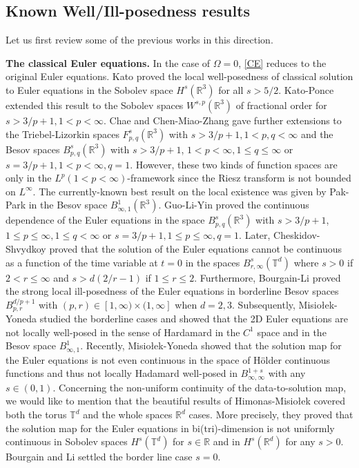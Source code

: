 \documentclass[12pt]{article}
\newcommand{\R}{\mathbb{R}}
\begin{document}
\subsection{Known Well/Ill-posedness results}
Let us first review some of the previous works in this direction.

{\bf The classical Euler equations.}\;
In the case of $\Omega=0$, \eqref{CE} reduces to the original Euler equations. Kato \cite{Kato} proved the local well-posedness of classical solution to Euler equations in the Sobolev space $H^s(\mathbb{R}^3)$ for all $s>5/2$. Kato-Ponce \cite{KatoP} extended this result to the Sobolev spaces $W^{s, p}(\mathbb{R}^3)$ of fractional order for $s>3 / p+1,1<p<\infty$. Chae \cite{Chae1,Chae2,Chae3} and Chen-Miao-Zhang \cite{Miao} gave further extensions to the Triebel-Lizorkin spaces $F_{p, q}^s(\mathbb{R}^3)$ with $s>3 / p+1,1<p, q<\infty$ and the Besov spaces $B_{p, q}^s(\mathbb{R}^3)$ with $s>3 / p+1$, $1<p<\infty, 1 \leq q \leq \infty$ or $s=3 / p+1,1<p<\infty, q=1$. However, these two kinds of function spaces are only in the $L^p(1<p<\infty)$-framework since the Riesz transform is not bounded on $L^{\infty}$. The currently-known best result on the local existence was given by Pak-Park \cite{Pak} in the Besov space $B_{\infty, 1}^1(\mathbb{R}^3)$.  Guo-Li-Yin \cite{GLY} proved the continuous dependence of the  Euler equations in the space $B_{p, q}^s(\mathbb{R}^3)$ with $s>3 / p+1$, $1\leq p\leq \infty, 1 \leq q < \infty$ or $s=3 / p+1,1\leq p\leq \infty, q=1$. Later, Cheskidov-Shvydkoy \cite{Cheskidov} proved that the solution of the Euler equations cannot be continuous as a function
of the time variable at $t = 0$ in the spaces $B^s_{r,\infty}(\mathbb{T}^d)$ where $s > 0$ if $2 < r \leq \infty$ and $s>d(2/r-1)$
if $1 \leq r \leq 2$. Furthermore, Bourgain-Li \cite{Bourgain1,Bourgain2} proved the strong local ill-posedness of the Euler equations in borderline Besov spaces $B^{d/p+1}_{p,r}$ with $(p,r)\in[1,\infty)\times(1,\infty]$ when $d=2,3$. Subsequently, Misio{\l}ek-Yoneda \cite{MY} studied the borderline cases and showed that the 2D Euler equations are not locally well-posed in the sense of Hardamard in the $C^1$ space and in the Besov space $B^1_{\infty,1}$.
Recently, Misio{\l}ek-Yoneda \cite{MY2} showed that the solution map for the Euler equations is not even continuous in the space of H\"{o}lder continuous functions and thus not locally Hadamard well-posed in $B^{1+s}_{\infty,\infty}$ with any $s\in(0,1)$. Concerning the non-uniform continuity of the data-to-solution map, we would like to mention that the beautiful results of Himonas-Misio{\l}ek \cite{HM1} covered both the torus $\mathbb{T}^d$ and the whole spaces $\R^d$ cases. More precisely, they proved that the solution map for the Euler equations in bi(tri)-dimension is not uniformly continuous in Sobolev spaces $H^s(\mathbb{T}^d)$ for $s\in \R$ and in $H^s(\mathbb{R}^d)$ for any $s>0$. Bourgain and Li \cite{Bou} settled the border line case $s = 0$.
\end{document}
